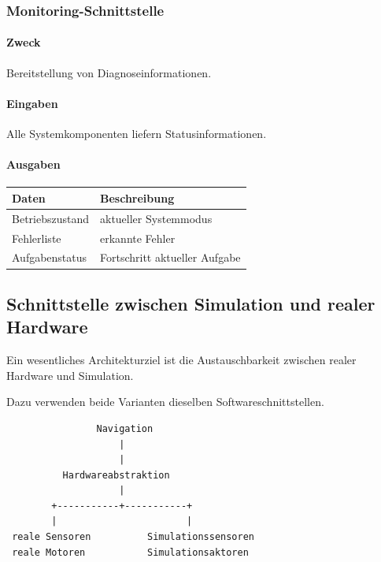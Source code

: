 \documentclass[
  a4paper,
  12pt,
  DIV=12,        %
  parskip=half,  %
  headings=small %
]{scrartcl}
\theoremstyle{definition}
\theoremstyle{definition}
\begin{document}
\subsubsection{Monitoring-Schnittstelle}\label{monitoring-schnittstelle}

\paragraph{Zweck}\label{zweck-10}

Bereitstellung von Diagnoseinformationen.

\paragraph{Eingaben}\label{eingaben-4}

Alle Systemkomponenten liefern Statusinformationen.

\paragraph{Ausgaben}\label{ausgaben-4}

\begin{longtable}[]{@{}ll@{}}
\toprule\noalign{}
Daten & Beschreibung \\
\midrule\noalign{}
\endhead
\bottomrule\noalign{}
\endlastfoot
Betriebszustand & aktueller Systemmodus \\
Fehlerliste & erkannte Fehler \\
Aufgabenstatus & Fortschritt aktueller Aufgabe \\
\end{longtable}

\subsection{Schnittstelle zwischen Simulation und realer
Hardware}\label{schnittstelle-zwischen-simulation-und-realer-hardware}

Ein wesentliches Architekturziel ist die Austauschbarkeit zwischen
realer Hardware und Simulation.

Dazu verwenden beide Varianten dieselben Softwareschnittstellen.

\begin{verbatim}
                Navigation
                    |
                    |
          Hardwareabstraktion
                    |
        +-----------+-----------+
        |                       |
 reale Sensoren          Simulationssensoren
 reale Motoren           Simulationsaktoren
\end{verbatim}
\end{document}

